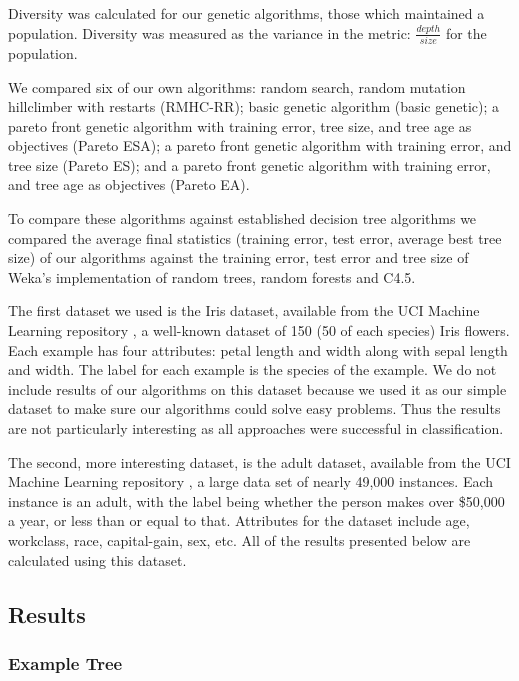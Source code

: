 \documentclass{acm_proc_article-sp}
\begin{document}
Diversity was calculated for our genetic algorithms, those which maintained a population. Diversity was measured as the variance in the metric: $\frac{depth}{size}$ for the population.

We compared six of our own algorithms: random search, random mutation hillclimber with restarts (RMHC-RR); basic genetic algorithm (basic genetic); a pareto front genetic algorithm with training error, tree size, and tree age as objectives (Pareto ESA); a pareto front genetic algorithm with training error, and tree size (Pareto ES); and a pareto front genetic algorithm with training error, and tree age as objectives (Pareto EA).

To compare these algorithms against established decision tree algorithms we compared the average final statistics (training error, test error, average best tree size) of our algorithms against the training error, test error and tree size of Weka's \cite{Hall:2009} implementation of random trees, random forests and C4.5.

The first dataset we used is the Iris dataset, available from the UCI Machine Learning repository \cite{Bache+Lichman:2013}, a well-known dataset of 150 (50 of each species) Iris flowers. Each example has four attributes: petal length and width along with sepal length and width. The label for each example is the species of the example. We do not include results of our algorithms on this dataset because we used it as our simple dataset to make sure our algorithms could solve easy problems. Thus the results are not particularly interesting as all approaches were successful in classification.

The second, more interesting dataset, is the adult dataset, available from the UCI Machine Learning repository \cite{Bache+Lichman:2013}, a large data set of nearly 49,000 instances. Each instance is an adult, with the label being whether the person makes over \$50,000 a year, or less than or equal to that. Attributes for the dataset include age, workclass, race, capital-gain, sex, etc. All of the results presented below are calculated using this dataset.

\subsection{Results}

\subsubsection{Example Tree}
\end{document}
